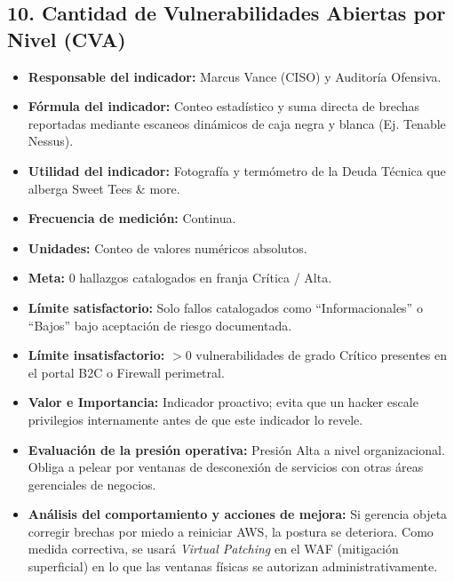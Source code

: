 \documentclass[11pt,a4paper]{article}
\begin{document}
\subsection{10. Cantidad de Vulnerabilidades Abiertas por Nivel (CVA)}
\begin{itemize}[label={--}, itemsep=0.1cm]
    \item \textbf{Responsable del indicador:} Marcus Vance (CISO) y Auditoría Ofensiva.
    \item \textbf{Fórmula del indicador:} Conteo estadístico y suma directa de brechas reportadas mediante escaneos dinámicos de caja negra y blanca (Ej. Tenable Nessus).
    \item \textbf{Utilidad del indicador:} Fotografía y termómetro de la Deuda Técnica que alberga Sweet Tees \& more.
    \item \textbf{Frecuencia de medición:} Continua.
    \item \textbf{Unidades:} Conteo de valores numéricos absolutos.
    \item \textbf{Meta:} 0 hallazgos catalogados en franja Crítica / Alta.
    \item \textbf{Límite satisfactorio:} Solo fallos catalogados como \enquote{Informacionales} o \enquote{Bajos} bajo aceptación de riesgo documentada.
    \item \textbf{Límite insatisfactorio:} $> 0$ vulnerabilidades de grado Crítico presentes en el portal B2C o Firewall perimetral.
    \item \textbf{Valor e Importancia:} Indicador proactivo; evita que un hacker escale privilegios internamente antes de que este indicador lo revele.
    \item \textbf{Evaluación de la presión operativa:} Presión Alta a nivel organizacional. Obliga a pelear por ventanas de desconexión de servicios con otras áreas gerenciales de negocios.
    \item \textbf{Análisis del comportamiento y acciones de mejora:} Si gerencia objeta corregir brechas por miedo a reiniciar AWS, la postura se deteriora. Como medida correctiva, se usará \textit{Virtual Patching} en el WAF (mitigación superficial) en lo que las ventanas físicas se autorizan administrativamente.
\end{itemize}
\end{document}
